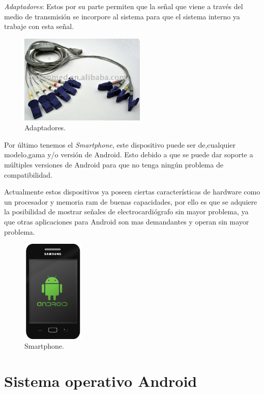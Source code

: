 \textit{Adaptadores}: Estos por su parte permiten que la señal que viene a través del medio de transmisión se incorpore al sistema para que el sistema interno ya trabaje con esta señal.\newpage
\begin{figure}[H]
   	\centering
		\includegraphics[width=6cm]{imag/adaptadores.PNG}
		\caption{Adaptadores.}
		\label{Adaptador}
\end{figure}
Por último tenemos el \textit{Smartphone}, este dispositivo puede ser de,cualquier modelo,gama y/o versión de Android. Esto debido a que se puede dar soporte a múltiples versiones de Android para que no tenga ningún problema de compatibilidad.\newline

Actualmente estos dispositivos ya poseen ciertas características de hardware como un procesador y memoria ram de buenas capacidades, por ello es que se adquiere la posibilidad de mostrar señales de electrocardiógrafo sin mayor problema, ya que otras aplicaciones para Android son mas demandantes y operan sin mayor problema.
\begin{figure}[H]
   	\centering
		\includegraphics[width=3cm]{imag/smartphone.PNG}
		\caption{Smartphone.}
		\label{phone}
\end{figure}
\chapter{Sistema operativo Android}


